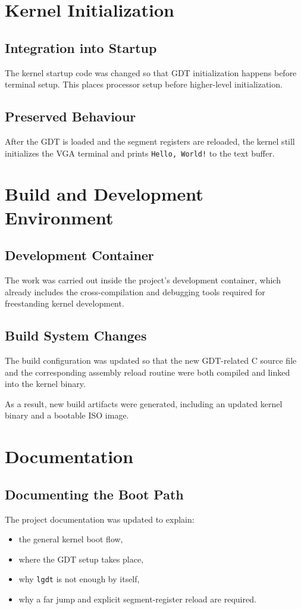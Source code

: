 \section{Kernel Initialization}

\subsection{Integration into Startup}
The kernel startup code was changed so that GDT initialization happens before terminal setup. This places processor setup before higher-level initialization.

\subsection{Preserved Behaviour}
After the GDT is loaded and the segment registers are reloaded, the kernel still initializes the VGA terminal and prints \texttt{Hello, World!} to the text buffer.

\section{Build and Development Environment}

\subsection{Development Container}
The work was carried out inside the project's development container, which already includes the cross-compilation and debugging tools required for freestanding kernel development.

\subsection{Build System Changes}
The build configuration was updated so that the new GDT-related C source file and the corresponding assembly reload routine were both compiled and linked into the kernel binary.

As a result, new build artifacts were generated, including an updated kernel binary and a bootable ISO image.

\section{Documentation}

\subsection{Documenting the Boot Path}
The project documentation was updated to explain:
\begin{itemize}
  \item the general kernel boot flow,
  \item where the GDT setup takes place,
  \item why \texttt{lgdt} is not enough by itself,
  \item why a far jump and explicit segment-register reload are required.
\end{itemize}

